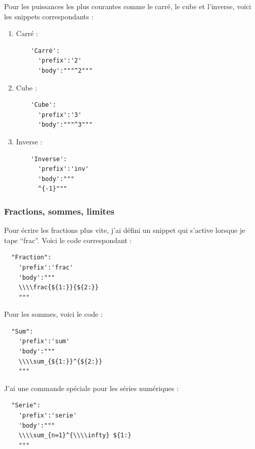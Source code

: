 \documentclass[french]{article}
\theoremstyle{definition}
\theoremstyle{remark}
\begin{document}
Pour les puissances les plus courantes comme le carré, le cube et l'inverse, voici les snippets correspondants :

\begin{enumerate}
  \item Carré :

  \begin{verbatim}
    'Carré':
      'prefix':'2'
      'body':"""^2"""
  \end{verbatim}

  \item Cube :

  \begin{verbatim}
    'Cube':
      'prefix':'3'
      'body':"""^3"""
  \end{verbatim}

  \item Inverse :

  \begin{verbatim}
    'Inverse':
      'prefix':'inv'
      'body':"""
      ^{-1}"""
  \end{verbatim}
\end{enumerate}

\subsubsection{Fractions, sommes, limites}

Pour écrire les fractions plus vite, j'ai défini un snippet qui s'active lorsque je tape ``frac''. Voici le code correspondant :

\begin{verbatim}
  "Fraction":
    'prefix':'frac'
    'body':"""
    \\\\frac{${1:}}{${2:}}
    """
\end{verbatim}

Pour les sommes, voici le code :

\begin{verbatim}
  "Sum":
    'prefix':'sum'
    'body':"""
    \\\\sum_{${1:}}^{${2:}}
    """
\end{verbatim}

J'ai une commande spéciale pour les séries numériques :

\begin{verbatim}
  "Serie":
    'prefix':'serie'
    'body':"""
    \\\\sum_{n=1}^{\\\\infty} ${1:}
    """
\end{verbatim}
\end{document}
